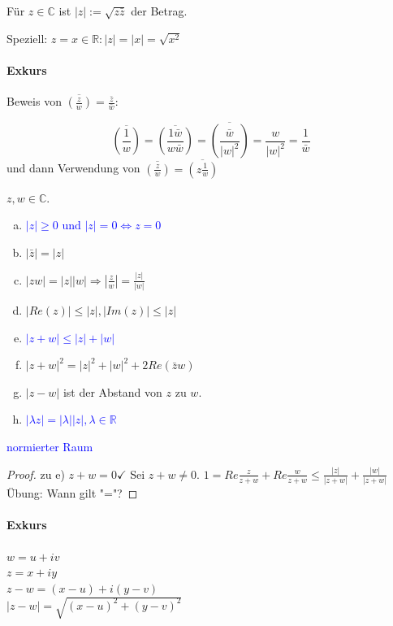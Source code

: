 \documentclass[a4paper,11pt,notitlepage]{report}
\theoremstyle{definition}
\newcommand{\R}{{\ensuremath{\mathbb{R}}}}
\newcommand{\C}{{\ensuremath{\mathbb{C}}}}
\newenvironment{definition}[1]{
	\begin{definitions}
	\marginnote{\emph{#1}}
}{\end{definitions}}
\begin{document}
\begin{definition}{Betrag}
Für $z \in \C$ ist $|z| := \sqrt{z \bar{z}}$ der Betrag.

Speziell: $z = x \in \R: |z| = |x| = \sqrt{x^2}$
\end{definition}

\paragraph{Exkurs}
Beweis von $\overline{(\frac{z}{w})} = \frac{\bar{z}}{\bar{w}}$:

$$\overline{\left(\frac{1}{w}\right)} = \overline{\left(\frac{1 \bar{w}}{w \bar{w}}\right)} = \overline{\left(\frac{\bar{w}}{|w|^2}\right)} = \frac{w}{|w|^2} = \frac{1}{\bar{w}}$$ und dann Verwendung von $\overline{\left(\frac{z}{w}\right)} = \overline{\left(z \frac{1}{w}\right)}$

\begin{theorem}
	$z,w \in \C$.
	\begin{enumerate}[a)]
		\item \textcolor{blue}{$|z| \geq 0$ und $|z|= 0 \Leftrightarrow z = 0$}
		\item $|\bar{z}| = |z|$
		\item $|zw| = |z||w| \Rightarrow |\frac{z}{w}|= \frac{|z|}{|w|}$
		\item $|Re(z)| \leq |z|, |Im(z)| \leq |z|$
		\item \textcolor{blue}{$|z+w| \leq |z| + |w|$}
		\item $|z+w|^2 = |z|^2 + |w|^2 + 2 Re (\bar{z} w)$
		\item $|z-w|$ ist der Abstand von $z$ zu $w$.
		\item \textcolor{blue}{$|\lambda z| = |\lambda| |z|, \lambda \in \R$}
	\end{enumerate}
	\textcolor{blue}{normierter Raum}
\end{theorem}

\begin{proof}
	zu e) $z + w = 0 \checkmark$
	Sei $z+w \neq 0.$
	$1 = Re \frac{z}{z+w} + Re \frac{w}{z+w} \leq \frac{|z|}{|z+w|} + \frac{|w|}{|z+w|}$ \newline Übung: Wann gilt "="?
\end{proof}

\paragraph{Exkurs}
$w = u+iv$\\
$z = x+iy$\\
$z-w = (x-u) + i(y-v)$\\
$|z-w| = \sqrt{(x-u)^2 + (y-v)^2}$
\end{document}
